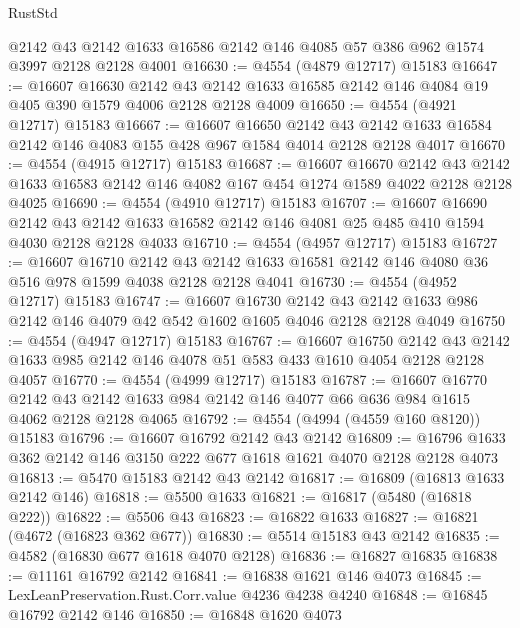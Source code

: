 \begin{lexlean}{RustStd}
\begin{coremodule}
{\begin{coremodule}
{{{{{{{{{{{{{{{{    @2142
    @43
    @2142
    @1633
    @16586
    @2142
    @146
    @4085
    @57
    @386
    @962
    @1574
    @3997
    @2128
    @2128
    @4001
@16630 := @4554 (@4879 @12717) @15183
@16647 := @16607
    @16630
    @2142
    @43
    @2142
    @1633
    @16585
    @2142
    @146
    @4084
    @19
    @405
    @390
    @1579
    @4006
    @2128
    @2128
    @4009
@16650 := @4554 (@4921 @12717) @15183
@16667 := @16607
    @16650
    @2142
    @43
    @2142
    @1633
    @16584
    @2142
    @146
    @4083
    @155
    @428
    @967
    @1584
    @4014
    @2128
    @2128
    @4017
@16670 := @4554 (@4915 @12717) @15183
@16687 := @16607
    @16670
    @2142
    @43
    @2142
    @1633
    @16583
    @2142
    @146
    @4082
    @167
    @454
    @1274
    @1589
    @4022
    @2128
    @2128
    @4025
@16690 := @4554 (@4910 @12717) @15183
@16707 := @16607
    @16690
    @2142
    @43
    @2142
    @1633
    @16582
    @2142
    @146
    @4081
    @25
    @485
    @410
    @1594
    @4030
    @2128
    @2128
    @4033
@16710 := @4554 (@4957 @12717) @15183
@16727 := @16607
    @16710
    @2142
    @43
    @2142
    @1633
    @16581
    @2142
    @146
    @4080
    @36
    @516
    @978
    @1599
    @4038
    @2128
    @2128
    @4041
@16730 := @4554 (@4952 @12717) @15183
@16747 := @16607
    @16730
    @2142
    @43
    @2142
    @1633
    @986
    @2142
    @146
    @4079
    @42
    @542
    @1602
    @1605
    @4046
    @2128
    @2128
    @4049
@16750 := @4554 (@4947 @12717) @15183
@16767 := @16607
    @16750
    @2142
    @43
    @2142
    @1633
    @985
    @2142
    @146
    @4078
    @51
    @583
    @433
    @1610
    @4054
    @2128
    @2128
    @4057
@16770 := @4554 (@4999 @12717) @15183
@16787 := @16607
    @16770
    @2142
    @43
    @2142
    @1633
    @984
    @2142
    @146
    @4077
    @66
    @636
    @984
    @1615
    @4062
    @2128
    @2128
    @4065
@16792 := @4554 (@4994 (@4559 @160 @8120)) @15183
@16796 := @16607 @16792 @2142 @43 @2142
@16809 := @16796 @1633 @362 @2142 @146 @3150 @222 @677 @1618 @1621 @4070 @2128 @2128 @4073
@16813 := @5470 @15183 @2142 @43 @2142
@16817 := @16809 (@16813 @1633 @2142 @146)
@16818 := @5500 @1633
@16821 := @16817 (@5480 (@16818 @222))
@16822 := @5506 @43
@16823 := @16822 @1633
@16827 := @16821 (@4672 (@16823 @362 @677))
@16830 := @5514 @15183 @43 @2142
@16835 := @4582 (@16830 @677 @1618 @4070 @2128)
@16836 := @16827 @16835
@16838 := @11161 @16792 @2142
@16841 := @16838 @1621 @146 @4073
@16845 := LexLeanPreservation.Rust.Corr.value @4236 @4238 @4240
@16848 := @16845 @16792 @2142 @146
@16850 := @16848 @1620 @4073
}}}}}}}}}}}}}}}}
\end{coremodule}}
\end{coremodule}
\end{lexlean}
